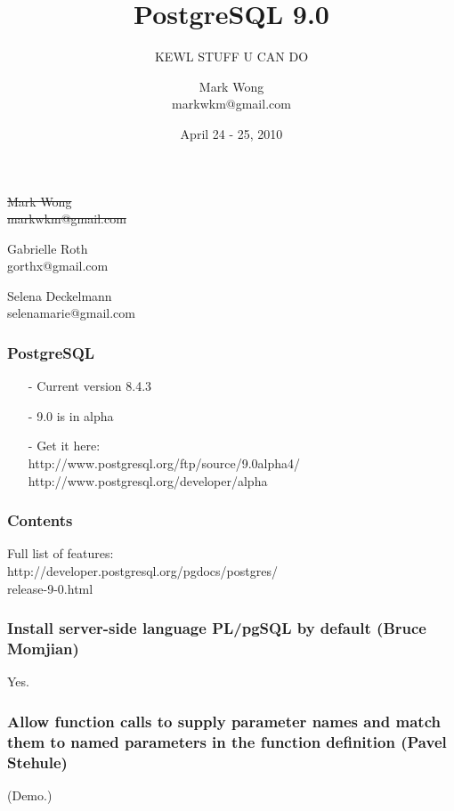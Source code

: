 \documentclass{beamer}
\title{PostgreSQL 9.0}
\subtitle{KEWL STUFF U CAN DO}
\author{Mark Wong\\markwkm@gmail.com}
\institute{LinuxFest Northwest 2010}
\date{April 24 - 25, 2010}
\begin{document}
\frame{\titlepage}

\frame
{
    \begin{center}
    \sout{Mark Wong\\markwkm@gmail.com}

    \mbox{}

    Gabrielle Roth\\gorthx@gmail.com

    \mbox{}

    Selena Deckelmann\\selenamarie@gmail.com
    \end{center}
}

\frame
{
  \frametitle{PostgreSQL}

  \begin{itemize}
  \item[-] Current version 8.4.3
  \item[-] 9.0 is in alpha
  \item[-] Get it here:\\
  http://www.postgresql.org/ftp/source/9.0alpha4/\\
  http://www.postgresql.org/developer/alpha
  \end{itemize}
}

\frame
{
  \frametitle{Contents}

  Full list of features:\\
  http://developer.postgresql.org/pgdocs/postgres/\\
  release-9-0.html
}

\frame
{
  \frametitle{Install server-side language PL/pgSQL by default (Bruce Momjian)}
  \begin{center}
  Yes.
  \end{center}
}

\frame
{
  \frametitle{Allow function calls to supply parameter names and match them to named parameters in the function definition (Pavel Stehule)}

(Demo.)
}

\end{document}
